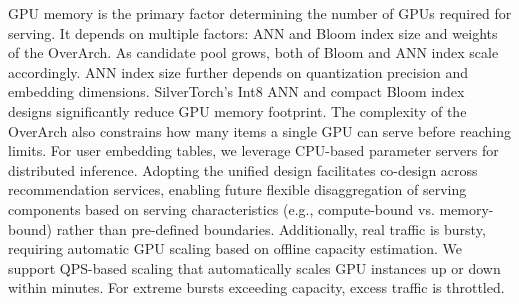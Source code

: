 GPU memory is the primary factor determining the number of GPUs required for serving. It depends on multiple factors: ANN and Bloom index size and weights of the OverArch. As candidate pool grows, both of Bloom and ANN index scale accordingly. ANN index size further depends on quantization precision and embedding dimensions. SilverTorch's Int8 ANN and compact Bloom index designs significantly reduce GPU memory footprint. The complexity of the OverArch also constrains how many items a single GPU can serve before reaching limits. For user embedding tables, we leverage CPU-based parameter servers for distributed inference.
Adopting the unified design facilitates co-design across recommendation services, enabling future flexible disaggregation of serving components based on serving characteristics (e.g., compute-bound vs. memory-bound) rather than pre-defined boundaries. Additionally, real traffic is bursty, requiring automatic GPU scaling based on offline capacity estimation. We support QPS-based scaling that automatically scales GPU instances up or down within minutes. For extreme bursts exceeding capacity, excess traffic is throttled.